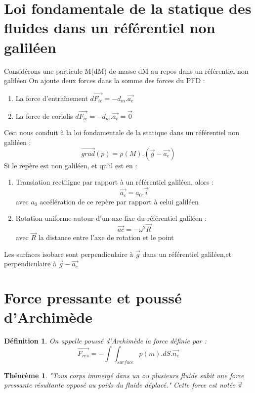 \documentclass[a4paper,12 pt,oneside]{report}     %
\newtheorem{de}{Définition}
\newtheorem{theo}{Théorème}
\begin{document}
\section{Loi fondamentale de la statique des fluides dans un référentiel non galiléen}
Considérons une particule M(dM) de masse dM au repos dans un référentiel non galiléen
On ajoute deux forces dans la somme des forces du PFD : \\
\begin{enumerate}
 \item La force d'entraînement $d\overrightarrow{F_{ie}} = -d_m.\overrightarrow{a_e}$ 
 \item La force de coriolis $d\overrightarrow{F_{ic}} = -d_m.\overrightarrow{a_c}=\overrightarrow{0}$ \\
\end{enumerate}
Ceci nous conduit à la loi fondamentale de la statique dans un référentiel non galiléen :
$$\overrightarrow{grad}(p) = \rho(M).(\overrightarrow{g}-\overrightarrow{a_e})$$
Si le repère est non galiléen, et qu'il est en : \\
\begin{enumerate}
 \item Translation rectiligne par rapport à un référentiel galiléen, alors :\\
	$$\overrightarrow{a_e}=a_0.\overrightarrow{i}$$
  avec $a_0$ accélération de ce repère par rapport à celui galiléen
 \item Rotation uniforme autour d'un axe fixe du référentiel galiléen :
$$\overrightarrow{ac} = -\omega^{2}\overrightarrow{R}$$
avec $\overrightarrow{R}$ la distance entre l'axe de rotation et le point \\
\end{enumerate}
Les surfaces isobare sont perpendiculaire à $\overrightarrow{g}$ dans un référentiel galiléen,et perpendiculaire à $\overrightarrow{g}-\overrightarrow{a_e}$
\section{Force pressante et poussé d'Archimède}
\begin{de}
On appelle poussé d'Archimède la force définie par : 
$$\overrightarrow{F_{res}} = -\int\int_{surface}p(m).dS.\overrightarrow{n_e}$$
\end{de}
\begin{theo}
 "Tous corps immergé dans un ou plusieurs fluide subit une force pressante résultante opposé au poids du fluide déplacé."
Cette force est notée $\overrightarrow{\pi}$
\end{theo}
\end{document}
